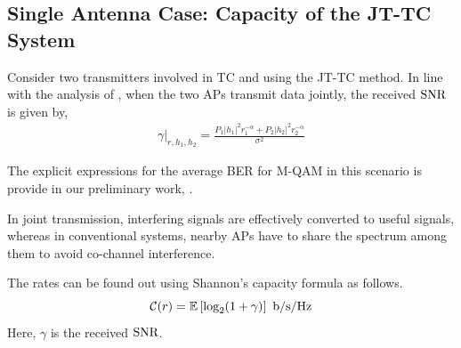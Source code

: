 









\subsection{Single Antenna Case: Capacity of the JT-TC System}
\label{subsec:single_antenna}


Consider two transmitters involved in TC and using the JT-TC method.
In line with the analysis of \cite{CapAnalJT}, when the two APs transmit data jointly, the received $\text{SNR}$ is given by,
\begin{align}\label{eq:sinr_jt}
\gamma|_{r,h_1,h_2}=\frac{P_1|h_1|^2r_1^{-\alpha} + P_2|h_2|^2r_2^{-\alpha}}{\sigma^2}
\end{align}

The explicit expressions for the average BER for M-QAM in this scenario is provide in our preliminary work, \cite{JT_decision}.

In joint transmission, interfering signals are effectively converted to useful signals, whereas in conventional systems, nearby APs have to share the spectrum among them to avoid co-channel interference. 

The rates can be found out using Shannon's capacity formula as follows.
\begin{equation}
    \label{eq:JT_Cap}
    \mathcal{C}(r) = \operatorname{\mathbb{E}} \left[\log_2(1 + \gamma)\right] \mbox{ b/s/Hz}
\end{equation}
Here, $\gamma$ is the received $\text{SNR}$.

